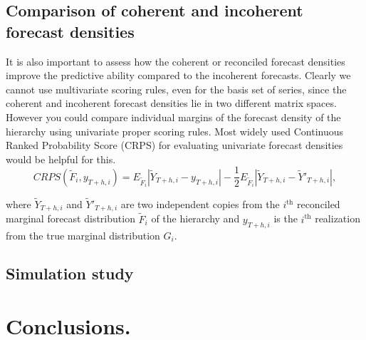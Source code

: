 \documentclass[a4paper, 11pt]{article}
\begin{document}
\subsection{Comparison of coherent and incoherent forecast densities}

It is also important to assess how the coherent or reconciled forecast densities improve the predictive ability compared to the incoherent forecasts. Clearly we cannot use multivariate scoring rules, even for the basis set of series, since the coherent and incoherent forecast densities lie in two different matrix spaces.\\

\noindent
However you could compare individual margins of the forecast density of the hierarchy using univariate proper scoring rules. Most widely used Continuous Ranked Probability Score (CRPS) for evaluating univariate forecast densities would be helpful for this. \\

\begin{equation} \label{eq:(3.6)}
CRPS(\tilde{F}_i,y_{T+h,i}) = E_{\tilde{F}_i}|\tilde{Y}_{T+h,i}-y_{T+h,i}| - \frac{1}{2}E_{\tilde{F}_i}|\tilde{Y}_{T+h,i}-\tilde{Y}'_{T+h,i}|,
\end{equation}
       
\noindent
where $\tilde{Y}_{T+h,i}$ and $\tilde{Y}'_{T+h,i}$ are two independent copies from the $i^{\text{th}}$ reconciled marginal forecast distribution $\tilde{F}_i$ of the hierarchy and $y_{T+h,i}$ is the $i^{\text{th}}$ realization from the true marginal distribution $G_i$. 
 



\subsection{Simulation study}

\section{Conclusions.}




   



\newpage
\printbibliography
\end{document}
